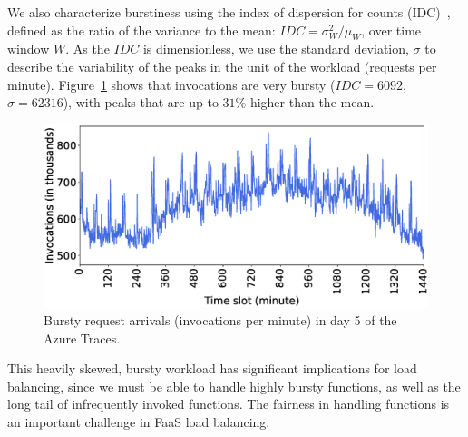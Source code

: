 We also characterize burstiness using the index of dispersion for counts (IDC)~\cite{Gusella:JSAC:1991:Characterizing,Jagerman:CISS:1994:Burstiness},
defined as the ratio of the variance to the mean: $IDC = \sigma^2_W/\mu_W$,
over time window $W$.
As the $IDC$ is dimensionless, we use the standard deviation, $\sigma$ to describe the variability of the peaks in the unit of the workload (requests per minute).
Figure~\ref{fig:bursty:allworkloads} shows that invocations are very bursty ($IDC=6092$, $\sigma=62316$), with peaks that are up to $31\%$ higher than the mean.

\begin{figure}[t]
    \centering
    \includegraphics[width=\columnwidth]{../Figures/bursty-all_triggers.eps}
    \caption{Bursty request arrivals (invocations per minute) in day 5 of the Azure Traces.}
    \label{fig:bursty:allworkloads}
\end{figure}

This heavily skewed, bursty workload has significant implications for load balancing, since we must be able to handle highly bursty functions, as well as the long tail of infrequently invoked functions.
The fairness in handling functions is an important challenge in FaaS load balancing. 

